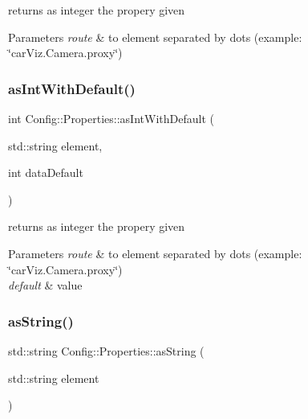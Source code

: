 returns as integer the propery given 


\begin{DoxyParams}{Parameters}
{\em route} & to element separated by dots (example\+: \char`\"{}car\+Viz.\+Camera.\+proxy\char`\"{}) \\
\hline
\end{DoxyParams}
\mbox{\label{class_config_1_1_properties_a513b23817b03c01443252a58aea17fc1}} 
\subsubsection{\texorpdfstring{as\+Int\+With\+Default()}{asIntWithDefault()}}
{\footnotesize\ttfamily int Config\+::\+Properties\+::as\+Int\+With\+Default (\begin{DoxyParamCaption}\item[{std\+::string}]{element,  }\item[{int}]{data\+Default }\end{DoxyParamCaption})}



returns as integer the propery given 


\begin{DoxyParams}{Parameters}
{\em route} & to element separated by dots (example\+: \char`\"{}car\+Viz.\+Camera.\+proxy\char`\"{}) \\
\hline
{\em default} & value \\
\hline
\end{DoxyParams}
\mbox{\label{class_config_1_1_properties_a87fb20ec94658e8ce0cce06b239019be}} 
\subsubsection{\texorpdfstring{as\+String()}{asString()}}
{\footnotesize\ttfamily std\+::string Config\+::\+Properties\+::as\+String (\begin{DoxyParamCaption}\item[{std\+::string}]{element }\end{DoxyParamCaption})}



